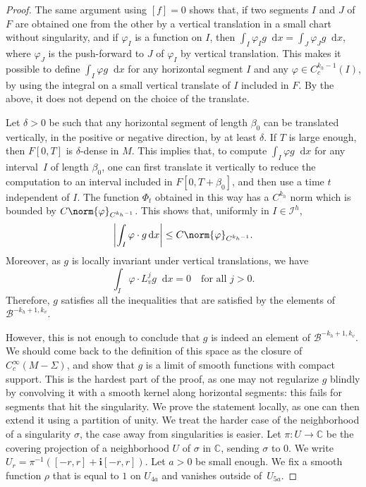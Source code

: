\documentclass[10pt]{amsart}
\newcommand{\boI}{\mathcal{I}}
\newcommand{\boB}{\mathcal{B}}
\newcommand{\CC}{\mathbb{C}}
\newcommand{\dd}{\mathop{}\!\mathrm{d}}
\newcommand{\ic}{\mathbf{i}}
\newcommand{\absgg}[1]{\biggl \lvert#1\biggr\rvert}
\let\phi\varphi
\theoremstyle{definition}
\numberwithin{equation}{section}
\begin{document}
\begin{proof}
The same argument using $[f] = 0$ shows that, if two segments $I$ and $J$ of
$F$ are obtained one from the other by a vertical translation in a small
chart without singularity, and if $\phi_I$ is a function on $I$, then $\int_I
\phi_I g \dd x = \int_J \phi_J g \dd x$, where $\phi_J$ is the push-forward
to $J$ of $\phi_I$ by vertical translation. This makes it possible to define
$\int_I \phi g \dd x$ for any horizontal segment $I$ and any $\phi \in
C^{k_h-1}_c(I)$, by using the integral on a small vertical translate of $I$
included in $F$. By the above, it does not depend on the choice of the
translate.

Let $\delta>0$ be such that any horizontal segment of length $\beta_0$ can be
translated vertically, in the positive or negative direction, by at least
$\delta$. If $T$ is large enough, then $F[0,T]$ is $\delta$-dense in $M$.
This implies that, to compute $\int_I \phi g \dd x$ for any interval~$I$ of
length $\beta_0$, one can first translate it vertically to reduce the
computation to an interval included in $F[0,T+\beta_0]$, and then use a time
$t$ independent of $I$. The function $\Phi_t$ obtained in this way has a
$C^{k_h}$ norm which is bounded by $C\norm{\phi}_{C^{k_h-1}}$. This shows
that, uniformly in $I \in \boI^h$,
\begin{equation*}
\absgg{\int_I \phi \cdot g \dd x} \leq C \norm{\phi}_{C^{k_h-1}}.
\end{equation*}
Moreover, as $g$ is locally invariant under vertical translations, we have
\[
\int_I \phi \cdot L_v^j g \dd x = 0\quad\text{for all }j>0.
\]
Therefore, $g$ satisfies
all the inequalities that are satisfied by the elements of $\boB^{-k_h+1,
k_v}$.

However, this is not enough to conclude that $g$ is indeed an element of
$\boB^{-k_h+1, k_v}$. We should come back to the definition of this space as
the closure of $C^\infty_c(M-\Sigma)$, and show that $g$ is a limit of smooth
functions with compact support. This is the hardest part of the proof, as one
may not regularize $g$ blindly by convolving it with a smooth kernel along
horizontal segments: this fails for segments that hit the singularity. We
prove the statement locally, as one can then extend it using a partition of
unity. We treat the harder case of the neighborhood of a singularity
$\sigma$, the case away from singularities is easier. Let $\pi: U \to \CC$ be
the covering projection of a neighborhood $U$ of $\sigma$ in $\CC$, sending
$\sigma$ to $0$. We write $U_r = \pi^{-1}([-r, r] + \ic [-r, r])$. Let $a>0$
be small enough. We fix a smooth function $\rho$ that is equal to $1$ on
$U_{4a}$ and vanishes outside of~$U_{5a}$.


\end{proof}
\end{document}
